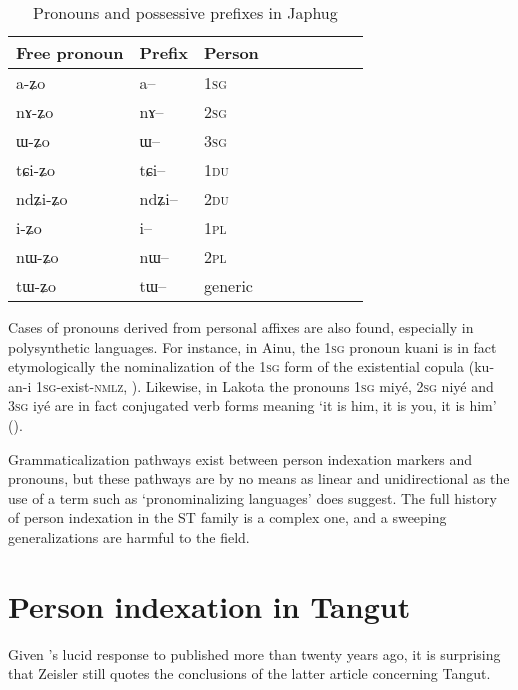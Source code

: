 \documentclass[oldfontcommands,oneside,a4paper,11pt]{article}
\newcommand{\ipa}[1]{{\phon \mbox{#1}}} %
\begin{document}
 \begin{table}[H] \centering
\caption{Pronouns and possessive prefixes in Japhug}\label{tab:pronoun}
\begin{tabular}{lllllllll} 
\toprule
 Free pronoun & Prefix & Person\\
\midrule
 \ipa{a-ʑo}  &	\ipa{a--}  &		1\textsc{sg} \\
\ipa{nɤ-ʑo}  &	\ipa{nɤ--}  &			2\textsc{sg}\\
\ipa{ɯ-ʑo}  &	\ipa{ɯ--}  &			3\textsc{sg}\\
\midrule
\ipa{tɕi-ʑo}  &	\ipa{tɕi--}  &			1\textsc{du} \\
\ipa{ndʑi-ʑo}  &	\ipa{ndʑi--}  &		2\textsc{du} \\	
\midrule
\ipa{i-ʑo}    &	\ipa{i--}  &			1\textsc{pl} \\
\ipa{nɯ-ʑo}   &	\ipa{nɯ--}  &			2\textsc{pl} \\
\midrule
\ipa{tɯ-ʑo} & \ipa{tɯ--}   &  generic\\
\bottomrule
\end{tabular}
\end{table}

Cases of pronouns derived from personal affixes are also found, especially in polysynthetic languages. For instance, in Ainu, the \textsc{1sg} pronoun \ipa{kuani} is in fact etymologically the nominalization of the \textsc{1sg} form of the existential copula (\ipa{ku-an-i} \textsc{1sg}-exist-\textsc{nmlz}, \citealt[31]{shibatani90japan}). Likewise, in Lakota the pronouns \textsc{1sg} \ipa{miyé}, \textsc{2sg} \ipa{niyé} and \textsc{3sg} \ipa{iyé} are in fact conjugated verb forms meaning `it is him, it is you, it is him' (\citealt[707;754]{ullrich08}).

Grammaticalization pathways exist between person indexation markers and pronouns, but these pathways are by no means as linear and unidirectional as the use of a term such as `pronominalizing languages' does suggest. The full history of person indexation in the ST family is a complex one, and a sweeping generalizations are harmful to the field.

\section{Person indexation in Tangut}
Given \citet{kepping94conjugation}'s lucid response to \citet{lapolla92} published more than twenty years ago, it is surprising that Zeisler still quotes the conclusions of the latter article concerning Tangut.
\end{document}
